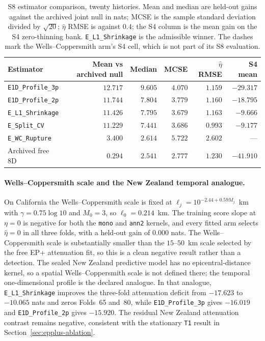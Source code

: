 \begin{table}[htbp]\centering\small
\setlength{\tabcolsep}{4pt}
\begin{tabular}{@{}lrrrrr@{}}\toprule
Estimator & Mean vs archived null & Median & MCSE & $\hat\eta$ RMSE & S4 mean\\\midrule
\texttt{E1D\_Profile\_3p} & $12.717$ & $9.605$ & $4.070$ & $1.159$ & $-29.317$\\
\texttt{E1D\_Profile\_2p} & $11.744$ & $7.804$ & $3.779$ & $1.160$ & $-18.795$\\
\texttt{E\_L1\_Shrinkage} & $11.426$ & $7.795$ & $3.679$ & $1.163$ & $-9.666$\\
\texttt{E\_Split\_CV} & $11.229$ & $7.441$ & $3.686$ & $0.993$ & $-9.177$\\
\texttt{E\_WC\_Rupture} & $3.400$ & $2.614$ & $5.722$ & $2.602$ & ---\\
Archived free 8D & $0.294$ & $2.541$ & $2.777$ & $1.230$ & $-41.910$\\
\bottomrule\end{tabular}
\caption{S8 estimator comparison, twenty histories. Mean and median are held-out gains against the archived joint null in nats; MCSE is the sample standard deviation divided by $\sqrt{20}$; $\hat\eta$ RMSE is against $0.4$; the S4 column is the mean gain on the S4 zero-thinning bank. \texttt{E\_L1\_Shrinkage} is the admissible winner. The dashes mark the Wells--Coppersmith arm's S4 cell, which is not part of its S8 evaluation.}
\label{tab:pathway3-estimators}
\end{table}

\paragraph{Wells--Coppersmith scale and the New Zealand temporal analogue.}
On California the Wells--Coppersmith scale is fixed at $\ell_j=10^{-2.44+0.59M_j}$~km with $\gamma=0.75\log 10$ and $M_0=3$, so $\ell_0=0.214$~km. The training score slope at $\eta=0$ is negative for both the \texttt{mono} and \texttt{ann2} kernels, and every fitted arm selects $\hat\eta=0$ in all three folds, with a held-out gain of $0.000$ nats. The Wells--Coppersmith scale is substantially smaller than the $15$--$50$~km scale selected by the free EP+ attenuation fit, so this is a clean negative result rather than a detection. The sealed New Zealand predictive model has no epicentral-distance kernel, so a spatial Wells--Coppersmith scale is not defined there; the temporal one-dimensional profile is the declared analogue. In that analogue, \texttt{E\_L1\_Shrinkage} improves the three-fold attenuation deficit from $-17.623$ to $-10.065$ nats and zeros Folds~65 and~80, while \texttt{E1D\_Profile\_3p} gives $-16.019$ and \texttt{E1D\_Profile\_2p} gives $-15.920$. The residual New Zealand attenuation contrast remains negative, consistent with the stationary \texttt{T1} result in Section~\ref{sec:epplus-ablation}.
